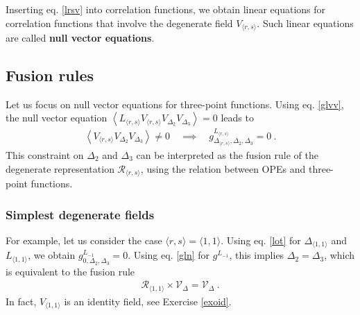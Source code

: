 \documentclass[12pt, a4paper, notitlepage, twoside]{report}
\numberwithin{equation}{section}
\theoremstyle{break}
\begin{document}
Inserting eq. \eqref{lrsv} into correlation functions, we obtain linear equations for correlation functions that involve the degenerate field $V_{\langle r,s\rangle}$. Such linear equations are called \textbf{\boldmath null vector equations}. 

\subsection{Fusion rules}\label{secfr}

Let us focus on null vector equations for three-point functions. 
Using eq. \eqref{glvv},
the null vector equation $\left< L_{\langle r,s \rangle} V_{\langle r,s \rangle} V_{\Delta_2}V_{\Delta_3}\right>=0$ leads to
\begin{align}
 \left< V_{\langle r,s \rangle} V_{\Delta_2}V_{\Delta_3}\right>\neq 0 \quad \implies \quad g^{L_{\langle r,s \rangle}}_{\Delta_{\langle r,s \rangle},\Delta_2,\Delta_3} = 0 \ .
\end{align}
This constraint on $\Delta_2$ and $\Delta_3$ can be interpreted as the fusion rule of the degenerate representation $\mathcal{R}_{\langle r,s \rangle}$, using the relation between OPEs and three-point functions.

\subsubsection{Simplest degenerate fields}

For example, let us consider the case $\langle r,s \rangle = \langle 1,1 \rangle$.
Using eq. \eqref{lot} for $\Delta_{\langle 1,1 \rangle}$ and $L_{\langle 1,1 \rangle}$, we obtain
$g^{L_{-1}}_{0,\Delta_2,\Delta_3} = 0$.
Using eq. \eqref{gln} for $g^{L_{-1}}$, this implies 
$
 \Delta_2=\Delta_3
$,
which is equivalent to the fusion rule
\begin{align}
 \boxed{\mathcal{R}_{\langle 1,1\rangle} \times \mathcal{V}_\Delta = \mathcal{V}_\Delta} \ .
 \label{roof}
\end{align}
In fact, $V_{\langle 1,1\rangle}$ is an identity field, see Exercise \ref{exoid}.
\end{document}
